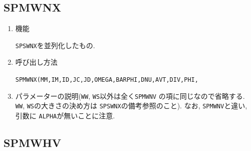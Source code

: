 
\subsection{SPMWNX}

\begin{enumerate}

\item 機能

{\tt SPSWNX}を並列化したもの.

\item 呼び出し方法 

{\tt SPMWNX(MM,IM,ID,JC,JD,OMEGA,BARPHI,DNU,AVT,DIV,PHI,}\\
\hspace*{10em}{\tt DAVT,DDIV,DPHI,RN,IRM,IT,T,Y,IP,P,R,IA,A,Q,WS,WW,W)}

\item パラメーターの説明({\tt WW}, {\tt WS}以外は全く{\tt SPMWNV}
の項に同じなので省略する. {\tt WW}, {\tt WS}の大きさの決め方は
{\tt SPSWNX}の備考参照のこと). なお, {\tt SPMWNV}と違い, 引数に
{\tt ALPHA}が無いことに注意.

\end{enumerate}


\subsection{SPMWHV}

